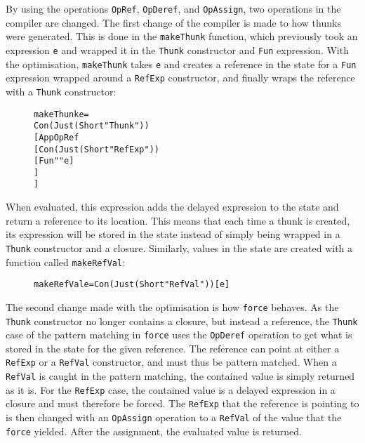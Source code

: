 By using the operations \texttt{OpRef}, \texttt{OpDeref}, and \texttt{OpAssign},
two operations in the compiler are changed. The first change of the compiler
is made to how thunks were generated. This is done in the
\texttt{makeThunk} function, which previously took an expression \texttt{e} and
wrapped it in the \texttt{Thunk} constructor and \texttt{Fun} expression. With
the optimisation, \texttt{makeThunk}
takes \texttt{e} and creates a reference in the state for a \texttt{Fun}
expression wrapped around a \texttt{RefExp} constructor, and finally wraps
the reference with a \texttt{Thunk} constructor:
\begin{figure}[H]
\begin{alltt}
  makeThunk e =
    Con (Just (Short "Thunk"))
      [App OpRef
        [Con (Just (Short "RefExp"))
          [Fun "" e]
        ]
      ]
\end{alltt}
\end{figure}
When evaluated, this expression adds the delayed expression to the state and
return a reference to its location. This means that each time a thunk is
created, its expression will be stored in the state instead of simply being wrapped in a
\texttt{Thunk} constructor and a closure. Similarly, values in the state are
created with a function called \texttt{makeRefVal}:
\begin{figure}[H]
\begin{alltt}
  makeRefVal e = Con (Just (Short "RefVal")) [e]
\end{alltt}
\end{figure}

The second change made with the optimisation is how \texttt{force}
behaves. As the \texttt{Thunk} constructor no longer contains a closure, but
instead a reference, the \texttt{Thunk} case of the pattern matching in
\texttt{force} uses the \texttt{OpDeref} operation to get what is stored in
the state for the given reference. The reference can point at either a
\texttt{RefExp} or a \texttt{RefVal} constructor, and must thus be pattern
matched. When a \texttt{RefVal} is caught in the pattern matching, the contained
value is simply returned as it is. For the \texttt{RefExp} case, the contained
value is a delayed expression in a closure and must therefore be forced.
The \texttt{RefExp} that the reference is pointing to is then changed with an
\texttt{OpAssign} operation to a \texttt{RefVal} of the value that the
\texttt{force} yielded. After the assignment, the evaluated value is returned.

